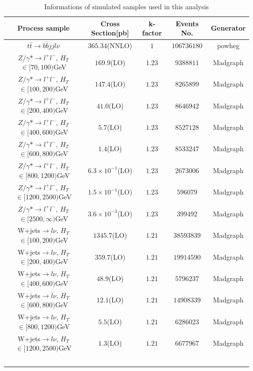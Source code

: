 		\begin{center}
		\begin{longtable}{ | c c c c c | }
		\caption{Informations of simulated samples used in this analysis} \\
		\hline
		Process sample & Cross Section[pb] & k-factor & Events No. & Generator \\ 
		\hline
		$t$$\bar{t}\rightarrow b \bar{b}jjl\nu$ & $365.34$(NNLO) & $1$ & $106736180$ & powheg \\
		\hline
		$Z / \gamma * \rightarrow l^+ l^-$, $H_{T}$ $\in [70,100)$GeV & $169.9$(LO) & $1.23$ & $9388811$ & Madgraph \\
		$Z / \gamma * \rightarrow l^+ l^-$, $H_{T}$ $\in [100,200)$GeV & $147.4$(LO) & $1.23$ & $8265899$ & Madgraph \\
		$Z / \gamma * \rightarrow l^+ l^-$, $H_{T}$ $\in [200,400)$GeV & $41.0$(LO) & $1.23$ & $8646942$ & Madgraph \\
		$Z / \gamma * \rightarrow l^+ l^-$, $H_{T}$ $\in [400,600)$GeV & $5.7$(LO) & $1.23$ & $8527128$ & Madgraph \\
		$Z / \gamma * \rightarrow l^+ l^-$, $H_{T}$ $\in [600,800)$GeV & $1.4$(LO) & $1.23$ & $8533247$ & Madgraph \\
		$Z / \gamma * \rightarrow l^+ l^-$, $H_{T}$ $\in [800,1200)$GeV & $6.3 \times 10^{-1}$(LO) & $1.23$ & $2673006$ & Madgraph \\
		$Z / \gamma * \rightarrow l^+ l^-$, $H_{T}$ $\in [1200,2500)$GeV & $1.5 \times 10^{-1}$(LO) & $1.23$ & $596079$ & Madgraph \\
		$Z / \gamma * \rightarrow l^+ l^-$, $H_{T}$ $\in [2500, \infty )$GeV & $3.6 \times 10^{-3}$(LO) & $1.23$ & $399492$ & Madgraph \\
		\hline
		W+jets$\rightarrow l \nu$, $H_{T}$ $\in [100,200)$GeV & $1345.7$(LO) & $1.21$ & $38593839$ & Madgraph \\
		W+jets$\rightarrow l \nu$, $H_{T}$ $\in [200,400)$GeV & $359.7$(LO) & $1.21$ & $19914590$ & Madgraph \\
		W+jets$\rightarrow l \nu$, $H_{T}$ $\in [400,600)$GeV & $48.9$(LO) & $1.21$ & $5796237$ & Madgraph \\
		W+jets$\rightarrow l \nu$, $H_{T}$ $\in [600,800)$GeV & $12.1$(LO) & $1.21$ & $14908339$ & Madgraph \\
		W+jets$\rightarrow l \nu$, $H_{T}$ $\in [800,1200)$GeV & $5.5$(LO) & $1.21$ & $6286023$ & Madgraph \\
		W+jets$\rightarrow l \nu$, $H_{T}$ $\in [1200,2500)$GeV & $1.3$(LO) & $1.21$ & $6677967$ & Madgraph \\
$$
\end{longtable}
\end{center}
